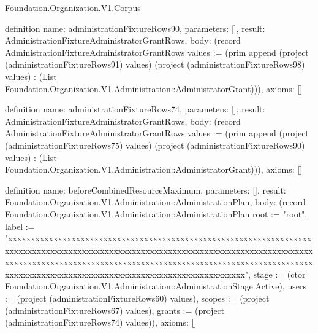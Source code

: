 \begin{lexlean}{Foundation.Organization.V1.Corpus}
\begin{semanticmodule}
definition{
  name: administrationFixtureRows90,
  parameters: [],
  result: AdministrationFixtureAdministratorGrantRows,
  body: (record AdministrationFixtureAdministratorGrantRows {values := (prim append (project (administrationFixtureRows91) values) (project (administrationFixtureRows98) values) : (List Foundation.Organization.V1.Administration::AdministratorGrant))}),
  axioms: []
}

definition{
  name: administrationFixtureRows74,
  parameters: [],
  result: AdministrationFixtureAdministratorGrantRows,
  body: (record AdministrationFixtureAdministratorGrantRows {values := (prim append (project (administrationFixtureRows75) values) (project (administrationFixtureRows90) values) : (List Foundation.Organization.V1.Administration::AdministratorGrant))}),
  axioms: []
}

definition{
  name: beforeCombinedResourceMaximum,
  parameters: [],
  result: Foundation.Organization.V1.Administration::AdministrationPlan,
  body: (record Foundation.Organization.V1.Administration::AdministrationPlan {root := "root", label := "xxxxxxxxxxxxxxxxxxxxxxxxxxxxxxxxxxxxxxxxxxxxxxxxxxxxxxxxxxxxxxxxxxxxxxxxxxxxxxxxxxxxxxxxxxxxxxxxxxxxxxxxxxxxxxxxxxxxxxxxxxxxxxxxxxxxxxxxxxxxxxxxxxxxxxxxxxxxxxxxxxxxxxxxxxxxxxxxxxxxxxxxxxxxxxxxxxxxxxxxxxxxxxxxxxxxxxxxxxxxxxxxxxxxxxxxxxxxxxxxxxxxxxxxxxxxxxxx", stage := (ctor Foundation.Organization.V1.Administration::AdministrationStage.Active), users := (project (administrationFixtureRows60) values), scopes := (project (administrationFixtureRows67) values), grants := (project (administrationFixtureRows74) values)}),
  axioms: []
}


\end{semanticmodule}
\end{lexlean}
